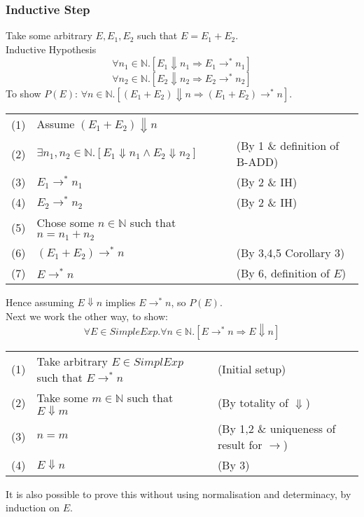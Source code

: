 \documentclass{report}
\begin{document}
            \subsubsection*{Inductive Step}
                Take some arbitrary $E, E_1, E_2$ such that $E = E_1 + E_2$.
                \\ Inductive Hypothesis
                \[\forall n_1 \in \mathbb{N} . [E_1 \Downarrow n_1 \Rightarrow E_1 \to^* n_1]\]
                \[\forall n_2 \in \mathbb{N} . [E_2 \Downarrow n_2 \Rightarrow E_2 \to^* n_2]\]
                To show $P(E)$: $\forall n \in \mathbb{N} . [(E_1 + E_2) \Downarrow n \Rightarrow (E_1 + E_2) \to^* n]$.
                \begin{center}
                    \begin{tabular}{l l l}
                        (1) & Assume $(E_1 + E_2) \Downarrow n$ & \\
                        (2) & $\exists n_1, n_2 \in \mathbb{N} . [E_1 \Downarrow n_1 \land E_2 \Downarrow n_2]$ & (By 1 \& definition of B-ADD) \\
                        (3) & $E_1 \to^* n_1$ & (By 2 \& IH) \\
                        (4) & $E_2 \to^* n_2$ & (By 2 \& IH) \\ 
                        (5) & Chose some $n \in \mathbb{N}$ such that $n = n_1 + n_2$ & \\
                        (6) & $(E_1 + E_2) \to^* n$ & (By 3,4,5 Corollary 3) \\
                        (7) & $E \to^* n$ & (By 6, definition of $E$) \\
                    \end{tabular}
                \end{center}
                Hence assuming $E \Downarrow n$ implies $E \to^* n$, so $P(E)$.
                \\
                Next we work the other way, to show:
                \[\forall E \in SimpleExp . \forall n \in \mathbb{N}.[E \to^* n \Rightarrow E \Downarrow n ]\]
                \begin{center}
                    \begin{tabular}{l l l}
                        (1) & Take arbitrary $E \in SimplExp$ such that $E \to^* n$ & (Initial setup) \\
                        (2) & Take some $m \in \mathbb{N}$ such that $E \Downarrow m$ & (By totality of $\Downarrow$) \\
                        (3) & $n = m$ & (By 1,2 \& uniqueness of result for $\to$) \\
                        (4) & $E \Downarrow n$ & (By 3) \\
                    \end{tabular}
                \end{center}
                It is also possible to prove this without using normalisation and determinacy, by induction on $E$.
\end{document}
